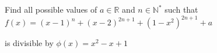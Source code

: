 Find all possible values of $a\in \mathbb{R}$ and $n\in \mathbb{N^*}$ such that $f(x)=(x-1)^n+(x-2)^{2n+1}+(1-x^2)^{2n+1}+a$

is divisible by $\phi (x)=x^2-x+1$